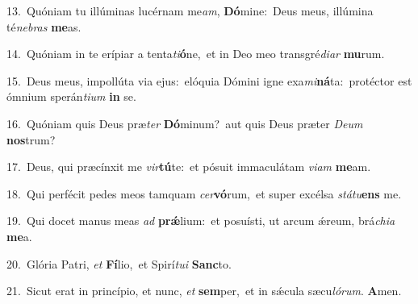 {\numbfont\textcolor{\numbcolor}{13.}}~Quóniam tu illúminas lucérnam me\-\textit{am}\-, \textbf{Dó}\-mine:~\star Deus meus, illúmina té\-\textit{ne}\-\textit{bras} \textbf{me}\-as.\par
{\numbfont\textcolor{\numbcolor}{14.}}~Quóniam in te erípiar a tenta\-\textit{ti}\-\textbf{ó}ne,~\star et in Deo meo transgré\-\textit{di}\-\textit{ar} \textbf{mu}\-rum.\par
{\numbfont\textcolor{\numbcolor}{15.}}~Deus meus, impollúta via ejus:~\dagger elóquia Dómini igne exa\-\textit{mi}\-\textbf{ná}ta:~\star protéctor est ómnium sperán\-\textit{ti}\-\textit{um} \textbf{in} se.\par
{\numbfont\textcolor{\numbcolor}{16.}}~Quóniam quis Deus præ\textit{ter} \textbf{Dó}\-minum?~\star aut quis Deus præter \textit{De}\-\textit{um} \textbf{nos}\-trum?\par
{\numbfont\textcolor{\numbcolor}{17.}}~Deus, qui præcínxit me \textit{vir}\-\textbf{tú}te:~\star et pósuit immaculátam \textit{vi}\-\textit{am} \textbf{me}\-am.\par
{\numbfont\textcolor{\numbcolor}{18.}}~Qui perfécit pedes meos tamquam \textit{cer}\-\textbf{vó}rum,~\star et super excélsa \textit{stá}\-\textit{tu}\textbf{ens} me.\par
{\numbfont\textcolor{\numbcolor}{19.}}~Qui docet manus meas \textit{ad} \textbf{prǽ}\-lium:~\star et posuísti, ut arcum ǽreum, brá\-\textit{chi}\-\textit{a} \textbf{me}\-a.\par
{\numbfont\textcolor{\numbcolor}{20.}}~Glória Patri, \textit{et} \textbf{Fí}\-lio,~\star et Spirí\-\textit{tu}\-\textit{i} \textbf{Sanc}\-to.\par
{\numbfont\textcolor{\numbcolor}{21.}}~Sicut erat in princípio, et nunc, \textit{et} \textbf{sem}\-per,~\star et in sǽcula sæcu\-\textit{ló}\-\textit{rum}. \textbf{A}\-men.\par
